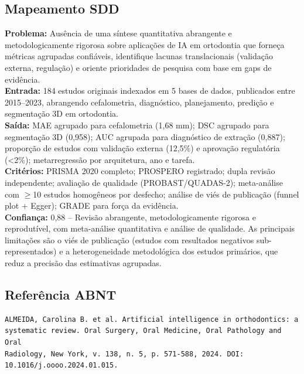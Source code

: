 \subsection{Mapeamento SDD}
\textbf{Problema:} Ausência de uma síntese quantitativa abrangente e
metodologicamente rigorosa sobre aplicações de IA em ortodontia que
forneça métricas agrupadas confiáveis, identifique lacunas
translacionais (validação externa, regulação) e oriente prioridades
de pesquisa com base em gaps de evidência. \\
\textbf{Entrada:} 184 estudos originais indexados em 5 bases de dados,
publicados entre 2015--2023, abrangendo cefalometria, diagnóstico,
planejamento, predição e segmentação 3D em ortodontia. \\
\textbf{Saída:} MAE agrupado para cefalometria (1,68 mm); DSC agrupado
para segmentação 3D (0,958); AUC agrupada para diagnóstico de extração
(0,887); proporção de estudos com validação externa (12,5\%) e
aprovação regulatória (<2\%); metarregressão por arquitetura, ano e
tarefa. \\
\textbf{Critérios:} PRISMA 2020 completo; PROSPERO registrado; dupla
revisão independente; avaliação de qualidade (PROBAST/QUADAS-2);
meta-análise com $\geq$10 estudos homogêneos por desfecho; análise de
viés de publicação (funnel plot + Egger); GRADE para força da evidência. \\
\textbf{Confiança:} 0,88 -- Revisão abrangente, metodologicamente
rigorosa e reprodutível, com meta-análise quantitativa e análise de
qualidade. As principais limitações são o viés de publicação (estudos
com resultados negativos sub-representados) e a heterogeneidade
metodológica dos estudos primários, que reduz a precisão das
estimativas agrupadas.

\subsection{Referência ABNT}
\begin{verbatim}
ALMEIDA, Carolina B. et al. Artificial intelligence in orthodontics: a
systematic review. Oral Surgery, Oral Medicine, Oral Pathology and Oral
Radiology, New York, v. 138, n. 5, p. 571-588, 2024. DOI:
10.1016/j.oooo.2024.01.015.
\end{verbatim}
\endinput
